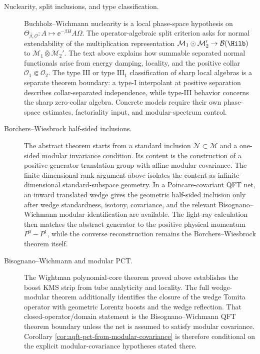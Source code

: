 \begin{description}
\item[Nuclearity, split inclusions, and type classification.]
Buchholz--Wichmann nuclearity is a local phase-space hypothesis on
\(\Theta_{\beta,\mathcal O}:A\mapsto \ee^{-\beta H}A\Omega\).  The
operator-algebraic split criterion asks for normal extendability of the
multiplication representation
\(\mathcal M_1\odot\mathcal M_2'\to\mathcal B(\Hilb)\) to
\(\mathcal M_1\bar\otimes\mathcal M_2'\).  The text above explains how
summable separated normal functionals arise from energy damping, locality,
and the positive collar \(\mathcal O_1\Subset\mathcal O_2\).  The type
\(\mathrm{III}\) or type \(\mathrm{III}_1\) classification of sharp local
algebras is a separate theorem boundary: a type-I interpolant at positive
separation describes collar-separated independence, while type-III behavior
concerns the sharp zero-collar algebra.  Concrete models require their own
phase-space estimates, factoriality input, and modular-spectrum control.

\item[Borchers--Wiesbrock half-sided inclusions.]
The abstract theorem starts from a standard inclusion
\(\mathcal N\subset\mathcal M\) and a one-sided modular invariance condition.
Its content is the construction of a positive-generator translation group
with affine modular covariance.  The finite-dimensional rank argument above
isolates the content as infinite-dimensional standard-subspace geometry.  In
a Poincare-covariant QFT net, an inward translated wedge gives the geometric
half-sided inclusion only after wedge standardness, isotony, covariance, and
the relevant Bisognano--\allowbreak Wichmann modular identification are
available.  The light-ray
calculation then matches the abstract generator to the positive physical
momentum \(P^0-P^1\), while the converse reconstruction remains the
Borchers--Wiesbrock theorem itself.

\item[Bisognano--Wichmann and modular PCT.]
The Wightman polynomial-core theorem proved above establishes the boost KMS
strip from tube analyticity and locality.  The full wedge-modular theorem
additionally identifies the closure of the wedge Tomita operator with
geometric Lorentz boosts and the wedge reflection.  That
closed-operator/domain statement is the Bisognano--Wichmann QFT theorem
boundary unless the net is assumed to satisfy modular covariance.  Corollary
\ref{cor:aqft-pct-from-modular-covariance} is therefore conditional on the
explicit modular-covariance hypotheses stated there.
\end{description}

